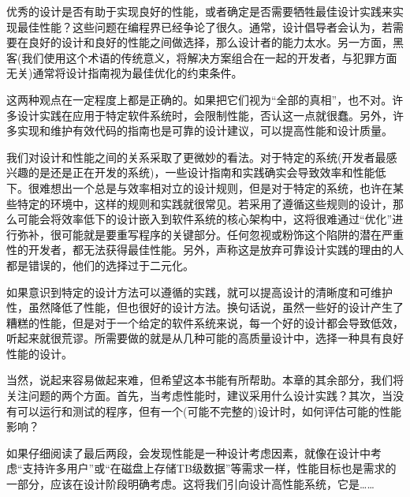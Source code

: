 优秀的设计是否有助于实现良好的性能，或者确定是否需要牺牲最佳设计实践来实现最佳性能？这些问题在编程界已经争论了很久。通常，设计倡导者会认为，若需要在良好的设计和良好的性能之间做选择，那么设计者的能力太水。另一方面，黑客(我们使用这个术语的传统意义，将解决方案组合在一起的开发者，与犯罪方面无关)通常将设计指南视为最佳优化的约束条件。 

这两种观点在一定程度上都是正确的。如果把它们视为“全部的真相”，也不对。许多设计实践在应用于特定软件系统时，会限制性能，否认这一点就很蠢。另外，许多实现和维护有效代码的指南也是可靠的设计建议，可以提高性能和设计质量。 

我们对设计和性能之间的关系采取了更微妙的看法。对于特定的系统(开发者最感兴趣的是还是正在开发的系统)，一些设计指南和实践确实会导致效率和性能低下。很难想出一个总是与效率相对立的设计规则，但是对于特定的系统，也许在某些特定的环境中，这样的规则和实践就很常见。若采用了遵循这些规则的设计，那么可能会将效率低下的设计嵌入到软件系统的核心架构中，这将很难通过“优化”进行弥补，很可能就是要重写程序的关键部分。任何忽视或粉饰这个陷阱的潜在严重性的开发者，都无法获得最佳性能。另外，声称这是放弃可靠设计实践的理由的人都是错误的，他们的选择过于二元化。 

如果意识到特定的设计方法可以遵循的实践，就可以提高设计的清晰度和可维护性，虽然降低了性能，但也很好的设计方法。换句话说，虽然一些好的设计产生了糟糕的性能，但是对于一个给定的软件系统来说，每一个好的设计都会导致低效，听起来就很荒谬。所需要做的就是从几种可能的高质量设计中，选择一种具有良好性能的设计。 

当然，说起来容易做起来难，但希望这本书能有所帮助。本章的其余部分，我们将关注问题的两个方面。首先，当考虑性能时，建议采用什么设计实践？其次，当没有可以运行和测试的程序，但有一个(可能不完整的)设计时，如何评估可能的性能影响？

如果仔细阅读了最后两段，会发现性能是一种设计考虑因素，就像在设计中考虑“支持许多用户”或“在磁盘上存储TB级数据”等需求一样，性能目标也是需求的一部分，应该在设计阶段明确考虑。这将我们引向设计高性能系统，它是……


































































